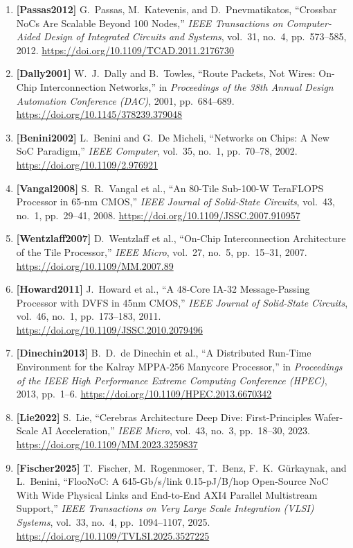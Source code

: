 \begin{enumerate}
    \item \textbf{[Passas2012]} G.~Passas, M.~Katevenis, and D.~Pnevmatikatos, ``Crossbar NoCs Are Scalable Beyond 100 Nodes,'' \emph{IEEE Transactions on Computer-Aided Design of Integrated Circuits and Systems}, vol.~31, no.~4, pp.~573--585, 2012. \url{https://doi.org/10.1109/TCAD.2011.2176730}
    \item \textbf{[Dally2001]} W.~J.~Dally and B.~Towles, ``Route Packets, Not Wires: On-Chip Interconnection Networks,'' in \emph{Proceedings of the 38th Annual Design Automation Conference (DAC)}, 2001, pp.~684--689. \url{https://doi.org/10.1145/378239.379048}
    \item \textbf{[Benini2002]} L.~Benini and G.~De Micheli, ``Networks on Chips: A New SoC Paradigm,'' \emph{IEEE Computer}, vol.~35, no.~1, pp.~70--78, 2002. \url{https://doi.org/10.1109/2.976921}
    \item \textbf{[Vangal2008]} S.~R.~Vangal et al., ``An 80-Tile Sub-100-W TeraFLOPS Processor in 65-nm CMOS,'' \emph{IEEE Journal of Solid-State Circuits}, vol.~43, no.~1, pp.~29--41, 2008. \url{https://doi.org/10.1109/JSSC.2007.910957}
    \item \textbf{[Wentzlaff2007]} D.~Wentzlaff et al., ``On-Chip Interconnection Architecture of the Tile Processor,'' \emph{IEEE Micro}, vol.~27, no.~5, pp.~15--31, 2007. \url{https://doi.org/10.1109/MM.2007.89}
    \item \textbf{[Howard2011]} J.~Howard et al., ``A 48-Core IA-32 Message-Passing Processor with DVFS in 45nm CMOS,'' \emph{IEEE Journal of Solid-State Circuits}, vol.~46, no.~1, pp.~173--183, 2011. \url{https://doi.org/10.1109/JSSC.2010.2079496}
    \item \textbf{[Dinechin2013]} B.~D.~de Dinechin et al., ``A Distributed Run-Time Environment for the Kalray MPPA-256 Manycore Processor,'' in \emph{Proceedings of the IEEE High Performance Extreme Computing Conference (HPEC)}, 2013, pp.~1--6. \url{https://doi.org/10.1109/HPEC.2013.6670342}
    \item \textbf{[Lie2022]} S.~Lie, ``Cerebras Architecture Deep Dive: First-Principles Wafer-Scale AI Acceleration,'' \emph{IEEE Micro}, vol.~43, no.~3, pp.~18--30, 2023. \url{https://doi.org/10.1109/MM.2023.3259837}
    \item \textbf{[Fischer2025]} T.~Fischer, M.~Rogenmoser, T.~Benz, F.~K.~G{\"{u}}rkaynak, and L.~Benini, ``FlooNoC: A 645-Gb/s/link 0.15-pJ/B/hop Open-Source NoC With Wide Physical Links and End-to-End AXI4 Parallel Multistream Support,'' \emph{IEEE Transactions on Very Large Scale Integration (VLSI) Systems}, vol.~33, no.~4, pp.~1094--1107, 2025. \url{https://doi.org/10.1109/TVLSI.2025.3527225}

\end{enumerate}
